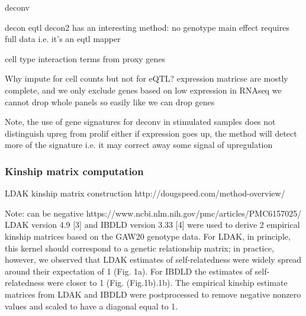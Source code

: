 deconv

    decon eqtl
        decon2 has an interesting method: no genotype main effect
        requires full data i.e. it's an eqtl mapper

    cell type interaction terms from proxy genes


Why impute for cell counts but not for eQTL?
expression matricse are mostly complete, and we only exclude genes based on low expression in RNAseq
we cannot drop whole panels so easily like we can drop genes

Note, the use of gene signatures for deconv
    in stimulated samples
    does not distinguish upreg from prolif either
    if expression goes up, the method will detect more of the signature
    i.e. it may correct away some signal of upregulation

\subsubsection{Kinship matrix computation}

LDAK kinship matrix construction http://dougspeed.com/method-overview/

Note: can be negative
https://www.ncbi.nlm.nih.gov/pmc/articles/PMC6157025/
LDAK version 4.9 [3] and IBDLD version 3.33 [4] were used to derive 2 empirical kinship matrices based on the GAW20 genotype data. For LDAK, in principle, this kernel should correspond to a genetic relationship matrix; in practice, however, we observed that LDAK estimates of self-relatedness were widely spread around their expectation of 1 (Fig. 1a). For IBDLD the estimates of self-relatedness were closer to 1 (Fig. (Fig.1b).1b). The empirical kinship estimate matrices from LDAK and IBDLD were postprocessed to remove negative nonzero values and scaled to have a diagonal equal to 1.

